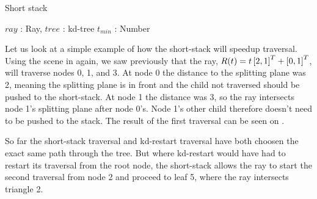 \begin{algorithm}
  \caption{Short stack}
  \label{alg:ShortStack}
  \begin{algorithmic}
              {$ray$ : Ray, $tree$ : kd-tree}
              {$t_{min}$ : Number}{
      \ELSE
      \ENDIF
          \ENDIF
        \ELSE
        \ENDIF
      \ENDWHILE
      \ENDFOR
      \ENDIF
    \ENDWHILE
              }
  \end{algorithmic}
\end{algorithm}


Let us look at a simple example of how the short-stack will speedup
traversal. Using the scene in  again, we saw
previously that the ray, $R(t) = t \left[2, 1 \right]^T + \left[0, 1 \right]^T$, will
traverse nodes 0, 1, and 3. At node 0 the distance to the splitting plane was 2,
meaning the splitting plane is in front and the child not traversed should be
pushed to the short-stack. At node 1 the distance was 3, so the ray intersects
node 1's splitting plane after node 0's. Node 1's other child therefore doesn't
need to be pushed to the stack. The result of the first traversal can be seen on
.

So far the short-stack traversal and kd-restart traversal have both choosen the
exact same path through the tree. But where kd-restart would have had to restart
its traversal from the root node, the short-stack allows the ray to start the
second traversal from node 2 and proceed to leaf 5, where the ray intersects
triangle 2.


